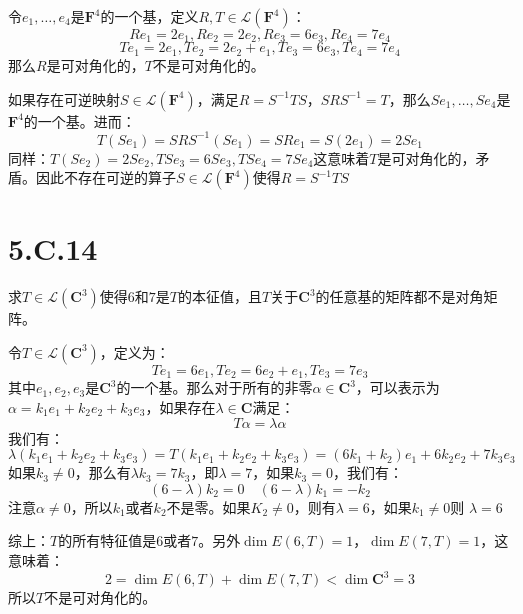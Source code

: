 \documentclass[10pt,a4paper,UTF8]{article}
\begin{document}
\begin{answer}
令\(e_{1},\ldots ,e_{4}\)是\(\mathbf{F}^{4}\)的一个基，定义\(R,T\in \mathcal{L}(\mathbf{F}^{4})\)：
\begin{equation}
\label{eq:15}
Re_{1} = 2e_{1},Re_{2} = 2e_{2},Re_{3} = 6e_{3},Re_{4} =7e_{4}
\end{equation}
\begin{equation}
\label{eq:16}
Te_{1} = 2e_{1}, Te_{2} = 2e_{2} + e_{1}, Te_{3} = 6e_{3},Te_{4} = 7e_{4}
\end{equation}
那么\(R\)是可对角化的，\(T\)不是可对角化的。

如果存在可逆映射\(S\in \mathcal{L}(\mathbf{F}^{4})\)，满足\(R= S^{-1}TS\)，\(SRS^{-1} = T\)，那么\(Se_{1},\ldots ,Se_{4}\)是\(\mathbf{F}^{4}\)的一个基。进而：
\begin{equation}
\label{eq:17}
T(Se_{1}) = SRS^{-1}(Se_{1}) = SRe_{1} = S(2e_{1}) = 2Se_{1}
\end{equation}
同样：\(T(Se_{2}) = 2Se_{2},TSe_{3} = 6Se_{3},TSe_{4} = 7Se_{4}\)这意味着\(T\)是可对角化的，矛盾。因此不存在可逆的算子\(S\in \mathcal{L}(\mathbf{F}^{4})\)使得\(R = S^{-1}TS\)
\end{answer}
\section{5.C.14}
\label{sec:org205216d}


\begin{problem}
求\(T\in \mathcal{L}(\mathbf{C}^{3})\)使得\(6\)和\(7\)是\(T\)的本征值，且\(T\)关于\(\mathbf{C}^{3}\)的任意基的矩阵都不是对角矩阵。
\end{problem}

\begin{answer}
令\(T\in \mathcal{L}(\mathbf{C}^{3})\)，定义为：
\begin{equation}
\label{eq:18}
Te_{1} = 6e_{1}, Te_{2} = 6e_{2} + e_{1}, Te_{3} = 7e_{3}
\end{equation}
其中\(e_{1},e_{2},e_{3}\)是\(\mathbf{C}^{3}\)的一个基。那么对于所有的非零\(\alpha\in \mathbf{C}^{3}\)，可以表示为\(\alpha = k_{1}e_{1} + k_{2}e_{2} + k_{3}e_{3}\)，如果存在\(\lambda\in \mathbf{C}\)满足：
\[T\alpha = \lambda \alpha\]我们有：
\begin{equation}
\label{eq:19}
\lambda (k_{1}e_{1} + k_{2}e_{2} + k_{3}e_{3}) = T (k_{1}e_{1} + k_{2}e_{2} + k_{3}e_{3}) = (6k_{1} + k_{2})e_{1} + 6k_{2}e_{2} + 7k_{3}e_{3}
\end{equation}
如果\(k_{3}\neq 0\)，那么有\(\lambda k_{3} = 7k_{3}\)，即\(\lambda = 7\)，如果\(k_{3} = 0\)，我们有：\[(6-\lambda)k_{2} = 0 \quad (6-\lambda)k_{1} = -k_{2}\]注意\(\alpha \neq 0\)，所以\(k_{1}\)或者\(k_{2}\)不是零。如果\(K_{2}\neq 0\)，则有\(\lambda = 6\)，如果\(k_{1} \neq 0\)则 \(\lambda = 6\)

综上：\(T\)的所有特征值是\(6\)或者\(7\)。另外\(\dim E(6,T) = 1\)，\(\dim E(7,T) = 1\)，这意味着：
\[2 = \dim E(6,T) + \dim E(7,T) < \dim \mathbf{C}^{3} = 3\]
所以\(T\)不是可对角化的。
\end{answer}
\end{document}
